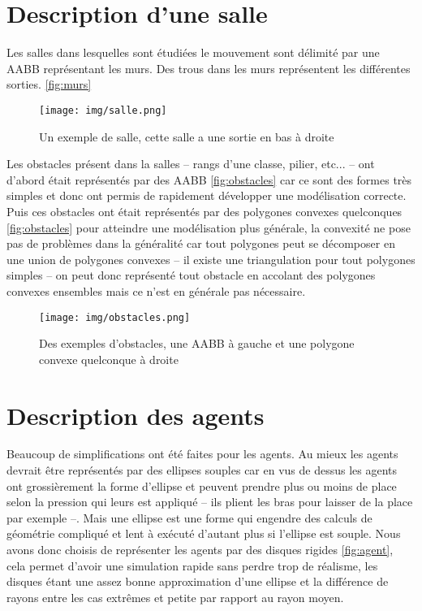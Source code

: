 \documentclass{article}
\begin{document}
\section{Description d'une salle}

Les salles dans lesquelles sont étudiées le mouvement sont délimité par
une AABB représentant les murs. Des trous dans les murs représentent les
différentes sorties. \autoref{fig:murs}

\begin{figure}[h]
  \texttt{[image: img/salle.png]}
  \caption{Un exemple de salle, cette salle a une sortie en bas à droite}
  \label{fig:murs}
\end{figure}

Les obstacles présent dans la salles -- rangs d'une classe, pilier, etc... --
ont d'abord était représentés par des AABB \autoref{fig:obstacles} car ce
sont des formes très simples
et donc ont permis de rapidement développer une modélisation correcte. Puis
ces obstacles ont était représentés par des polygones convexes quelconques
\autoref{fig:obstacles} pour atteindre une modélisation plus générale, la convexité
ne pose pas
de problèmes dans la généralité car tout polygones peut se décomposer en une
union de polygones convexes -- il existe une triangulation pour tout
polygones simples -- on peut donc représenté tout obstacle en accolant des
polygones convexes ensembles mais ce n'est en générale pas nécessaire.

\begin{figure}[h]
  \texttt{[image: img/obstacles.png]}
  \caption{Des exemples d'obstacles, une AABB à gauche et une polygone
    convexe quelconque à droite}
  \label{fig:obstacles}
\end{figure}


\section{Description des agents}

Beaucoup de simplifications ont été faites pour les agents. Au mieux les agents
devrait être représentés par des ellipses souples car en vus de dessus les agents
ont grossièrement la forme d'ellipse et peuvent prendre plus ou moins de place
selon la pression qui leurs est appliqué -- ils plient les bras pour laisser de
la place par exemple --. Mais une ellipse est une forme qui engendre des calculs
de géométrie compliqué et lent à exécuté d'autant plus si l'ellipse est souple.
Nous avons donc choisis de représenter les agents par des disques rigides \autoref{fig:agent},
cela permet d'avoir une simulation rapide sans perdre trop de réalisme, les
disques étant une assez bonne approximation d'une ellipse et la différence
de rayons entre les cas extrêmes et petite par rapport au rayon moyen.
\end{document}
